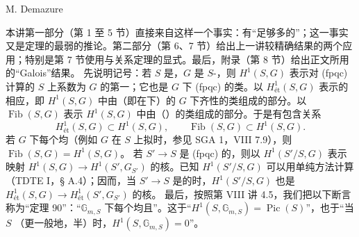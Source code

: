 \begin{center}M. Demazure\end{center}
本讲第一部分（第 1 至 5 节）直接来自这样一个事实：有“足够多的”；这一事实又是定理的最弱的推论。第二部分（第 6、7 节）给出上一讲较精确结果的两个应用；特别是第 7 节使用与关系定理的显式。最后，附录（第 8 节）给出正文所用的“Galois”结果。
先说明记号：若 $S$ 是，$G$ 是 $S$-，则 $H^1(S,G)$ 表示对 (fpqc) 计算的 $S$ 上系数为 $G$ 的第一；它也是 $G$ 下 (fpqc) 的类。以 $H^1_{\text{ét}}(S,G)$ 表示的相应，即 $H^1(S,G)$ 中由（即在下）的 $G$ 下齐性的类组成的部分。以 $\operatorname{Fib}(S,G)$ 表示 $H^1(S,G)$ 中由（）的类组成的部分。于是有包含关系
\[
H^1_{\text{ét}}(S,G)\subset H^1(S,G),\qquad \operatorname{Fib}(S,G)\subset H^1(S,G).
\]
若 $G$ 下每个均（例如 $G$ 在 $S$ 上拟时，参见 SGA 1，VIII 7.9），则 $\operatorname{Fib}(S,G)=H^1(S,G)$。
若 $S'\to S$ 是 (fpqc) 的，则以 $H^1(S'/S,G)$ 表示映射 $H^1(S,G)\to H^1(S',G_{S'})$ 的核。已知 $H^1(S'/S,G)$ 可以用单纯方法计算（TDTE I，§ A.4）；因而，当 $S'\to S$ 是的时，$H^1(S'/S,G)$ 也是 $H^1_{\text{ét}}(S,G)\to H^1_{\text{ét}}(S',G_{S'})$ 的核。
最后，按照第 VIII 讲 4.5，我们把以下断言称为“定理 90”：“$\mathbb G_{m,S}$ 下每个均且”。这于“$H^1(S,\mathbb G_{m,S})=\operatorname{Pic}(S)$”，也于“当 $S$ （更一般地，半）时，$H^1(S,\mathbb G_{m,S})=0$”。

